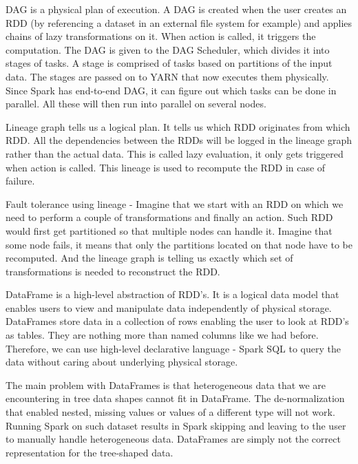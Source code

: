 DAG is a physical plan of execution. A DAG is created when the user creates an RDD (by referencing a dataset in an external file system for example) and applies chains of lazy transformations on it. When action is called, it triggers the computation. The DAG is given to the DAG Scheduler, which divides it into stages of tasks. A stage is comprised of tasks based on partitions of the input data. The stages are passed on to YARN that now executes them physically. Since Spark has end-to-end DAG, it can figure out which tasks can be done in parallel. All these will then run into parallel on several nodes. \cite{BigDataCourse} %

Lineage graph tells us a logical plan. It tells us which RDD originates from which RDD. All the dependencies between the RDDs will be logged in the lineage graph rather than the actual data. This is called lazy evaluation, it only gets triggered when action is called. This lineage is used to recompute the RDD in case of failure.

Fault tolerance using lineage - Imagine that we start with an RDD on which we need to perform a couple of transformations and finally an action. Such RDD would first get partitioned so that multiple nodes can handle it. Imagine that some node fails, it means that only the partitions located on that node have to be recomputed. And the lineage graph is telling us exactly which set of transformations is needed to reconstruct the RDD.

DataFrame is a high-level abstraction of RDD's. It is a logical data model that enables users to view and manipulate data independently of physical storage. DataFrames store data in a collection of rows enabling the user to look at RDD's as tables. They are nothing more than named columns like we had before. Therefore, we can use high-level declarative language - Spark SQL to query the data without caring about underlying physical storage.

The main problem with DataFrames is that heterogeneous data that we are encountering in tree data shapes cannot fit in DataFrame. The de-normalization that enabled nested, missing values or values of a different type will not work. Running Spark on such dataset results in Spark skipping and leaving to the user to manually handle heterogeneous data. DataFrames are simply not the correct representation for the tree-shaped data. 

